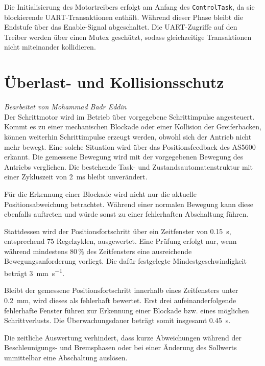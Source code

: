 Die Initialisierung des Motortreibers erfolgt am Anfang des
\texttt{ControlTask}, da sie blockierende UART-Transaktionen enthält.
Während dieser Phase bleibt die Endstufe über das Enable-Signal
abgeschaltet. Die UART-Zugriffe auf den Treiber werden über einen
Mutex geschützt, sodass gleichzeitige Transaktionen nicht
miteinander kollidieren.
\section{Überlast- und Kollisionsschutz}
\textit{Bearbeitet von Mohammad Badr Eddin}\\

Der Schrittmotor wird im Betrieb über vorgegebene Schrittimpulse
angesteuert. Kommt es zu einer mechanischen Blockade oder einer
Kollision der Greiferbacken, können weiterhin Schrittimpulse erzeugt
werden, obwohl sich der Antrieb nicht mehr bewegt. Eine solche
Situation wird über das Positionsfeedback des AS5600 erkannt. Die
gemessene Bewegung wird mit der vorgegebenen Bewegung des Antriebs
verglichen. Die bestehende Task- und Zustandsautomatenstruktur mit
einer Zykluszeit von \SI{2}{\milli\second} bleibt unverändert.

Für die Erkennung einer Blockade wird nicht nur die aktuelle
Positionsabweichung betrachtet. Während einer normalen Bewegung kann
diese ebenfalls auftreten und würde sonst zu einer fehlerhaften
Abschaltung führen.

Stattdessen wird der Positionsfortschritt über ein Zeitfenster von
\SI{0.15}{\second}, entsprechend 75 Regelzyklen, ausgewertet. Eine
Prüfung erfolgt nur, wenn während mindestens 80\,\% des Zeitfensters
eine ausreichende Bewegungsanforderung vorliegt. Die dafür festgelegte
Mindestgeschwindigkeit beträgt \SI{3}{\milli\meter\per\second}.

Bleibt der gemessene Positionsfortschritt innerhalb eines Zeitfensters
unter \SI{0.2}{\milli\meter}, wird dieses als fehlerhaft bewertet.
Erst drei aufeinanderfolgende fehlerhafte Fenster führen zur
Erkennung einer Blockade bzw. eines möglichen
Schrittverlusts. Die Überwachungsdauer beträgt somit insgesamt
\SI{0.45}{\second}.

Die zeitliche Auswertung verhindert, dass kurze Abweichungen während
der Beschleunigungs- und Bremsphasen oder bei einer Änderung des
Sollwerts unmittelbar eine Abschaltung auslösen.

